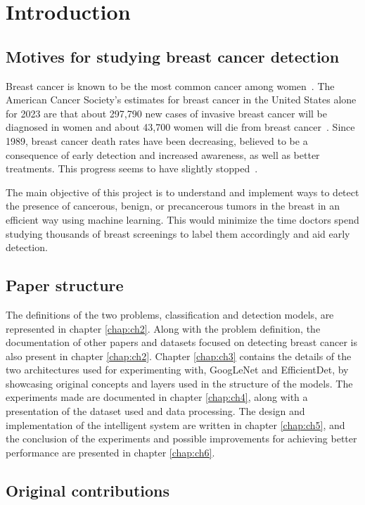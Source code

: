 \chapter{Introduction}
\label{intro}

\section{Motives for studying breast cancer detection}


Breast cancer is known to be the most common cancer among women~\cite{link1}. The American Cancer Society’s estimates for breast cancer in the United States alone for 2023 are that about 297,790 new cases of invasive breast cancer will be diagnosed in women and about 43,700 women will die from breast cancer~\cite{link2}. Since 1989, breast cancer death rates have been decreasing, believed to be a consequence of early detection and increased awareness, as well as better treatments. This progress seems to have slightly stopped~\cite{link2}.

The main objective of this project is to understand and implement ways to detect the presence of cancerous, benign, or precancerous tumors in the breast in an efficient way using machine learning. This would minimize the time doctors spend studying thousands of breast screenings to label them accordingly and aid early detection.

\section{Paper structure}

The definitions of the two problems, classification and detection models, are represented in chapter \ref{chap:ch2}. Along with the problem definition, the documentation of other papers and datasets focused on detecting breast cancer is also present in chapter \ref{chap:ch2}. Chapter \ref{chap:ch3} contains the details of the two architectures used for experimenting with, GoogLeNet and EfficientDet, by showcasing original concepts and layers used in the structure of the models. The experiments made are documented in chapter \ref{chap:ch4}, along with a presentation of the dataset used and data processing. The design and implementation of the intelligent system are written in chapter \ref{chap:ch5}, and the conclusion of the experiments and possible improvements for achieving better performance are presented in chapter \ref{chap:ch6}.

\section{Original contributions}


